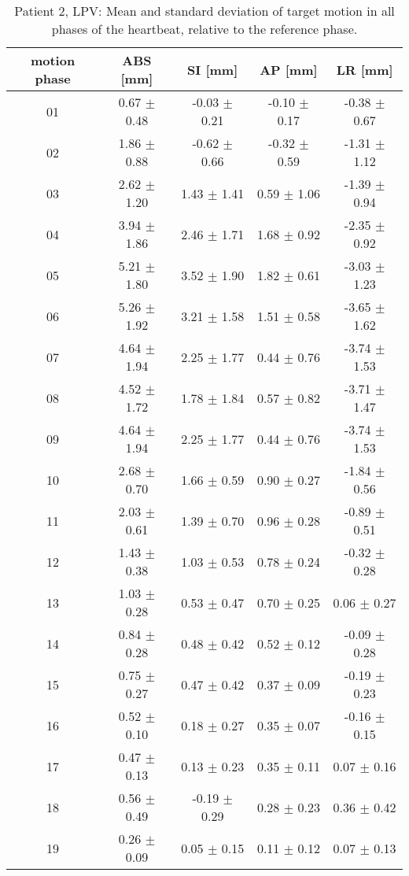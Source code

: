 \begin{table}[htbp]
  \centering
    \tiny
  \caption{Patient 2, LPV: Mean and standard deviation of target motion in all phases of the heartbeat, relative to the reference phase.}
  \begin{tabular}{|c|c|c|c|c|}
    \hline\hline
    motion phase\rule{0pt}{2.6ex}\rule[-1.2ex]{0pt}{0pt} & ABS [mm] & SI [mm] & AP [mm] & LR [mm]\\
    \hline
01& 0.67 $\pm$ 0.48& -0.03 $\pm$ 0.21& -0.10 $\pm$ 0.17& -0.38 $\pm$ 0.67 \\
02& 1.86 $\pm$ 0.88& -0.62 $\pm$ 0.66& -0.32 $\pm$ 0.59& -1.31 $\pm$ 1.12 \\
03& 2.62 $\pm$ 1.20& 1.43 $\pm$ 1.41& 0.59 $\pm$ 1.06& -1.39 $\pm$ 0.94 \\
04& 3.94 $\pm$ 1.86& 2.46 $\pm$ 1.71& 1.68 $\pm$ 0.92& -2.35 $\pm$ 0.92 \\
05& 5.21 $\pm$ 1.80& 3.52 $\pm$ 1.90& 1.82 $\pm$ 0.61& -3.03 $\pm$ 1.23 \\
06& 5.26 $\pm$ 1.92& 3.21 $\pm$ 1.58& 1.51 $\pm$ 0.58& -3.65 $\pm$ 1.62 \\
07& 4.64 $\pm$ 1.94& 2.25 $\pm$ 1.77& 0.44 $\pm$ 0.76& -3.74 $\pm$ 1.53 \\
08& 4.52 $\pm$ 1.72& 1.78 $\pm$ 1.84& 0.57 $\pm$ 0.82& -3.71 $\pm$ 1.47 \\ 
09& 4.64 $\pm$ 1.94& 2.25 $\pm$ 1.77& 0.44 $\pm$ 0.76& -3.74 $\pm$ 1.53 \\
10& 2.68 $\pm$ 0.70& 1.66 $\pm$ 0.59& 0.90 $\pm$ 0.27& -1.84 $\pm$ 0.56 \\
11& 2.03 $\pm$ 0.61& 1.39 $\pm$ 0.70& 0.96 $\pm$ 0.28& -0.89 $\pm$ 0.51 \\
12& 1.43 $\pm$ 0.38& 1.03 $\pm$ 0.53& 0.78 $\pm$ 0.24& -0.32 $\pm$ 0.28 \\
13& 1.03 $\pm$ 0.28& 0.53 $\pm$ 0.47& 0.70 $\pm$ 0.25& 0.06 $\pm$ 0.27 \\
14& 0.84 $\pm$ 0.28& 0.48 $\pm$ 0.42& 0.52 $\pm$ 0.12& -0.09 $\pm$ 0.28 \\
15& 0.75 $\pm$ 0.27& 0.47 $\pm$ 0.42& 0.37 $\pm$ 0.09& -0.19 $\pm$ 0.23 \\
16& 0.52 $\pm$ 0.10& 0.18 $\pm$ 0.27& 0.35 $\pm$ 0.07& -0.16 $\pm$ 0.15 \\
17& 0.47 $\pm$ 0.13& 0.13 $\pm$ 0.23& 0.35 $\pm$ 0.11& 0.07 $\pm$ 0.16 \\ 
18& 0.56 $\pm$ 0.49& -0.19 $\pm$ 0.29& 0.28 $\pm$ 0.23& 0.36 $\pm$ 0.42 \\ 
19& 0.26 $\pm$ 0.09& 0.05 $\pm$ 0.15& 0.11 $\pm$ 0.12& 0.07 $\pm$ 0.13 \\
    \hline\hline
  \end{tabular}
\end{table}

